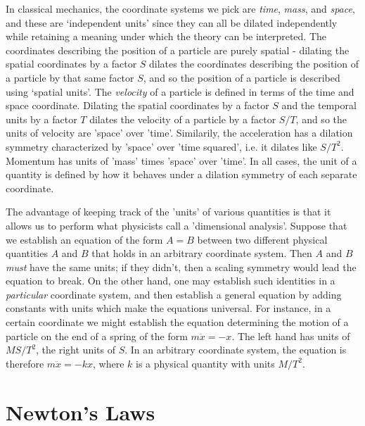 In classical mechanics, the coordinate systems we pick are \emph{time}, \emph{mass}, and \emph{space}, and these are `independent units' since they can all be dilated independently while retaining a meaning under which the theory can be interpreted. The coordinates describing the position of a particle are purely spatial - dilating the spatial coordinates by a factor $S$ dilates the coordinates describing the position of a particle by that same factor $S$, and so the position of a particle is described using `spatial units'. The \emph{velocity} of a particle is defined in terms of the time and space coordinate. Dilating the spatial coordinates by a factor $S$ and the temporal units by a factor $T$ dilates the velocity of a particle by a factor $S/T$, and so the units of velocity are 'space' over 'time'. Similarily, the acceleration has a dilation symmetry characterized by 'space' over 'time squared', i.e. it dilates like $S/T^2$. Momentum has units of 'mass' times 'space' over 'time'. In all cases, the unit of a quantity is defined by how it behaves under a dilation symmetry of each separate coordinate.

The advantage of keeping track of the 'units' of various quantities is that it allows us to perform what physicists call a 'dimensional analysis'. Suppose that we establish an equation of the form $A = B$ between two different physical quantities $A$ and $B$ that holds in an arbitrary coordinate system. Then $A$ and $B$ \emph{must} have the same units; if they didn't, then a scaling symmetry would lead the equation to break. On the other hand, one may establish such identities in a \emph{particular} coordinate system, and then establish a general equation by adding constants with units which make the equations universal. For instance, in a certain coordinate we might establish the equation determining the motion of a particle on the end of a spring of the form $m \ddot{x} = -x$. The left hand has units of $MS/T^2$, the right units of $S$. In an arbitrary coordinate system, the equation is therefore $m\ddot{x} = -kx$, where $k$ is a physical quantity with units $M/T^2$.

\chapter{Newton's Laws}

